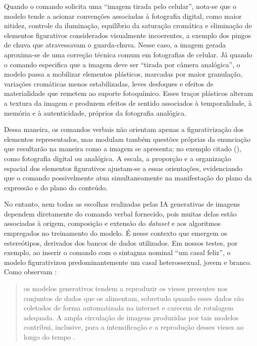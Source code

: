 \documentclass[portuguese]{textolivre}
\begin{document}
Quando o comando solicita uma “imagem tirada pelo celular”, nota-se que o modelo tende a acionar convenções associadas à fotografia digital, como maior nitidez, controle da iluminação, equilíbrio da saturação cromática e eliminação de elementos figurativos considerados visualmente incoerentes, a exemplo dos pingos de chuva que atravessavam o guarda-chuva. Nesse caso, a imagem gerada aproxima-se de uma correção técnica comum em fotografias de celular. Já quando o comando especifica que a imagem deve ser “tirada por câmera analógica”, o modelo passa a mobilizar elementos plásticos, marcadas por maior granulação, variações cromáticas menos estabilizadas, leves desfoques e efeitos de materialidade que remetem ao suporte fotoquímico. Esses traços plásticos alteram a textura da imagem e produzem efeitos de sentido associados à temporalidade, à memória e à autenticidade, próprios da fotografia analógica.

Dessa maneira, os comandos verbais não orientam apenas a figurativização dos elementos representados, mas modulam também questões próprias da enunciação que resultarão na maneira como a imagem se apresenta; no exemplo citado (), como fotografia digital ou analógica. A escala, a proporção e a organização espacial dos elementos figurativos ajustam-se a essas orientações, evidenciando que o comando possivelmente atua simultaneamente na manifestação do plano da expressão e do plano do conteúdo.

No entanto, nem todas as escolhas realizadas pelas IA generativas de imagens dependem diretamente do comando verbal fornecido, pois muitas delas estão associadas à origem, composição e extensão do \textit{dataset} e aos algoritmos empregados no treinamento do modelo. É nesse contexto que emergem os estereótipos, derivados dos bancos de dados utilizados. Em nossos testes, por exemplo, ao inserir o comando com o sintagma nominal “um casal feliz”, o modelo figurativizou predominantemente um casal heterossexual, jovem e branco. Como observam \textcite{ho2020denoising}:

\begin{quote}
    os modelos generativos tendem a reproduzir os vieses presentes nos conjuntos de dados que os alimentam, sobretudo quando esses dados são coletados de forma automatizada na internet e carecem de rotulagem adequada. A ampla circulação de imagens produzidas por tais modelos contribui, inclusive, para a intensificação e a reprodução desses vieses ao longo do tempo \cite[p.~9]{ho2020denoising}.
\end{quote}
\end{document}
